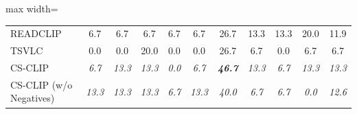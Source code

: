 \begin{table}[t]
\begin{adjustbox}{max width=\textwidth}
\begin{tabular}{p{5cm}c|c|c|c|c|c|c|c|c|c}
    READCLIP & 6.7 & 6.7 & 6.7 & 6.7 & 6.7 & 26.7 & 13.3 & 13.3 & 20.0 & 11.9 \\
    TSVLC & 0.0 & 0.0 & 20.0 & 0.0 & 0.0 & 26.7 & 6.7 & 0.0 & 6.7 & 6.7 \\
    \midrule
    CS-CLIP & \emph{6.7} & \emph{13.3} & \emph{13.3} & \emph{0.0} & \emph{6.7} & \emph{\textbf{46.7}} & \emph{13.3} & \emph{6.7} & \emph{13.3} & \emph{13.3} \\
    CS-CLIP (w/o Negatives) & \emph{13.3} & \emph{13.3} & \emph{13.3} & \emph{6.7} & \emph{13.3} & \emph{40.0} & \emph{6.7} & \emph{6.7} & \emph{0.0} & \emph{12.6} \\
    \bottomrule
  \end{tabular}
  \end{adjustbox}
\end{table}